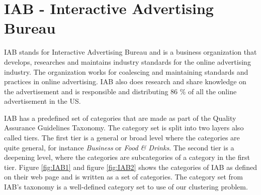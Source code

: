 
\section{IAB - Interactive Advertising Bureau}


IAB stands for Interactive Advertising Bureau and is a business organization that develops, researches and maintains industry standards for the online advertising industry. The organization works for coalescing and maintaining standards and practices in online advertising. IAB also does research and share knowledge on the advertisement and is responsible and distributing 86 \% of all the online advertisement in the US. \cite{IABabout}

IAB has a predefined set of categories that are made as part of the Quality Assurance Guidelines Taxonomy. The category set is split into two layers also called tiers. The first tier is a general or broad level where the categories are quite general, for instance \textit{Business} or \textit{Food \& Drinks}. The second tier is a deepening level, where the categories are subcategories of a category in the first tier.
Figure \ref{fig:IAB1} and figure \ref{fig:IAB2}
shows the categories of IAB as defined on their web page and is written as a set of categories. The category set from IAB's taxonomy is a well-defined category set to use of our clustering problem.  




